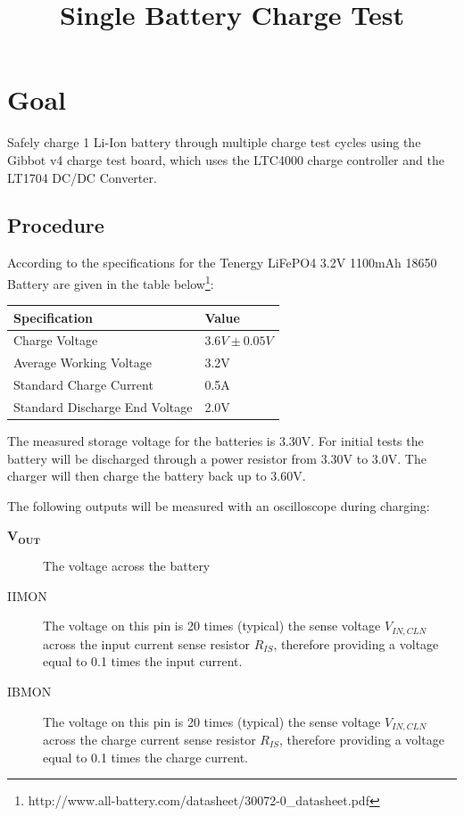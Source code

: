 \documentclass{article}
\begin{document}
\title{Single Battery Charge Test}
\date{}
\maketitle
\section{Goal}
Safely charge 1 Li-Ion battery through multiple charge test cycles using the Gibbot v4 charge test board, which uses the LTC4000 charge controller and the LT1704 DC/DC Converter. 

\subsection{Procedure}
According to the specifications for the Tenergy LiFePO4 3.2V 1100mAh 18650 Battery are given in the table below\footnote{http://www.all-battery.com/datasheet/30072-0\_datasheet.pdf}:

\begin{table}[h!]
\centering
\begin{tabular}{ | l | l |}
\hline
\textbf{Specification} & \textbf{Value} \\ \hline
Charge Voltage & $3.6V\pm0.05V$ \\ \hline
Average Working Voltage & 3.2V \\ \hline
Standard Charge Current & 0.5A \\ \hline
Standard Discharge End Voltage & 2.0V \\ \hline
\end{tabular}
\end{table}
The measured storage voltage for the batteries is 3.30V. 
For initial tests the battery will be discharged through a power resistor from 3.30V to 3.0V. The charger will then charge the battery back up to 3.60V.

The following outputs will be measured with an oscilloscope during charging:
\begin{description}
\item[$\mathbf{V_{OUT}}$] The voltage across the battery
\item[IIMON] The voltage on this pin is 20 times (typical) the sense voltage $V_{IN,CLN}$across the input current sense resistor $R_{IS}$, therefore providing a voltage equal to 0.1 times the input current.
\item[IBMON] The voltage on this pin is 20 times (typical) the sense voltage $V_{IN,CLN}$across the charge current sense resistor $R_{IS}$, therefore providing a voltage equal to 0.1 times the charge current.
\end{description}
\end{document}
